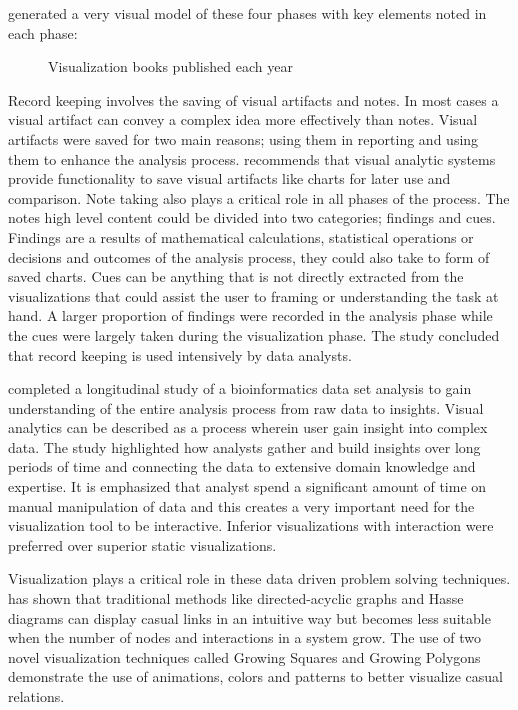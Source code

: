 \cite{mahyar2010closer} generated a very visual model of these four phases with key elements noted in each phase:
\begin{figure}[!ht]
	\centering{}
	\caption{Visualization books published each year}\label{fig:2}
\end{figure}

Record keeping involves the saving of visual artifacts and notes. In most cases a visual artifact can convey a complex idea more effectively than notes. Visual artifacts were saved for two main reasons; using them in reporting and using them to enhance the analysis process.\cite{mahyar2010closer} recommends that visual analytic systems provide functionality to save visual artifacts like charts for later use and comparison. Note taking also plays a critical role in all phases of the process. The notes high level content could be divided into two categories; findings and cues. Findings are a results of mathematical calculations, statistical operations or decisions and outcomes of the analysis process, they could also take to form of saved charts. Cues can be anything that is not directly extracted from the visualizations that could assist the user to framing or understanding the task at hand. A larger proportion of findings were recorded in the analysis phase while the cues were largely taken during the visualization phase. The study concluded that record keeping is used intensively by data analysts.

\cite{saraiya2006insight} completed a longitudinal study of a bioinformatics data set analysis to gain understanding of the entire analysis process from raw data to insights. Visual analytics can be described as a process wherein user gain insight into complex data. The study highlighted how analysts gather and build insights over long periods of time and connecting the data to extensive domain knowledge and expertise. It is emphasized that analyst spend a significant amount of time on manual manipulation of data and this creates a very important need for the visualization tool to be interactive. Inferior visualizations with interaction were preferred over superior static visualizations.

Visualization plays a critical role in these data driven problem solving techniques. \cite{elmqvist2004animated} has shown that traditional methods like directed-acyclic graphs and Hasse diagrams can display casual links in an intuitive way but becomes less suitable when the number of nodes and interactions in a system grow. The use of two novel visualization techniques called Growing Squares and Growing Polygons demonstrate the use of animations, colors and patterns to better visualize casual relations.

